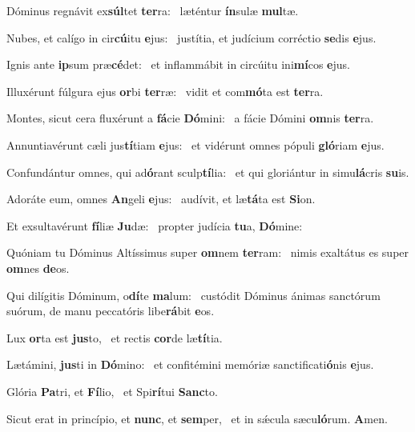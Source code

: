 \item Dóminus regnávit ex\textbf{súl}tet \textbf{ter}ra:~\psstar{} læténtur \textbf{ín}sulæ \textbf{mul}tæ.
\item Nubes, et calígo in cir\textbf{cú}itu \textbf{e}jus:~\psstar{} justítia, et judícium corréctio \textbf{se}dis \textbf{e}jus.
\item Ignis ante \textbf{ip}sum præ\textbf{cé}det:~\psstar{} et inflammábit in circúitu ini\textbf{mí}cos \textbf{e}jus.
\item Illuxérunt fúlgura ejus \textbf{or}bi \textbf{ter}ræ:~\psstar{} vidit et com\textbf{mó}ta est \textbf{ter}ra.
\item Montes, sicut cera fluxérunt a \textbf{fá}cie \textbf{Dó}mini:~\psstar{} a fácie Dómini \textbf{om}nis \textbf{ter}ra.
\item Annuntiavérunt cæli jus\textbf{tí}tiam \textbf{e}jus:~\psstar{} et vidérunt omnes pópuli \textbf{gló}riam \textbf{e}jus.
\item Confundántur omnes, qui ad\textbf{ó}rant sculp\textbf{tí}lia:~\psstar{} et qui gloriántur in simu\textbf{lá}cris \textbf{su}is.
\item Adoráte eum, omnes \textbf{An}geli \textbf{e}jus:~\psstar{} audívit, et læ\textbf{tá}ta est \textbf{Si}on.
\item Et exsultavérunt \textbf{fí}liæ \textbf{Ju}dæ:~\psstar{} propter judícia \textbf{tu}a, \textbf{Dó}mine:
\item Quóniam tu Dóminus Altíssimus super \textbf{om}nem \textbf{ter}ram:~\psstar{} nimis exaltátus es super \textbf{om}nes \textbf{de}os.
\item Qui dilígitis Dóminum, o\textbf{dí}te \textbf{ma}lum:~\psstar{} custódit Dóminus ánimas sanctórum suórum, de manu peccatóris libe\textbf{rá}bit \textbf{e}os.
\item Lux \textbf{or}ta est \textbf{jus}to,~\psstar{} et rectis \textbf{cor}de læ\textbf{tí}tia.
\item Lætámini, \textbf{jus}ti in \textbf{Dó}mino:~\psstar{} et confitémini memóriæ sanctificati\textbf{ó}nis \textbf{e}jus.
\item Glória \textbf{Pa}tri, et \textbf{Fí}lio,~\psstar{} et Spi\textbf{rí}tui \textbf{Sanc}to.
\item Sicut erat in princípio, et \textbf{nunc}, et \textbf{sem}per,~\psstar{} et in sǽcula sæcu\textbf{ló}rum. \textbf{A}men.
